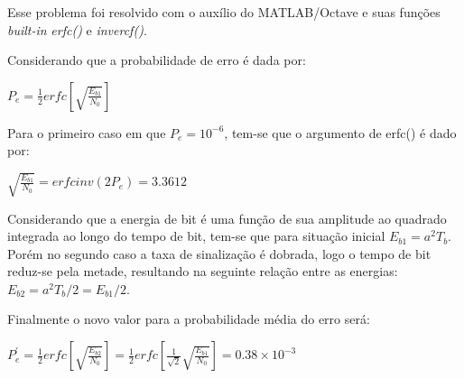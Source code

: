 Esse problema foi resolvido com o auxílio do MATLAB/Octave e suas funções \textit{built-in} \textit{erfc()} e \textit{invercf()}.

Considerando que a probabilidade de erro é dada por:

\begin{center}
    $P_e = \frac{1}{2} erfc \left[\sqrt{\frac{E_{b1}}{N_0}} \right]$
\end{center}

Para o primeiro caso em que $P_e = 10^{-6}$, tem-se que o argumento de erfc() é dado por:

\begin{center}
   $\sqrt{\frac{E_{b1}}{N_0}} = erfcinv(2P_e) = 3.3612$
\end{center}

Considerando que a energia de bit é uma função de sua amplitude ao quadrado integrada ao longo do tempo de bit, tem-se que para situação inicial $E_{b1} = a^2 T_b$. Porém no segundo caso a taxa de sinalização é dobrada, logo o tempo de bit reduz-se pela metade, resultando na seguinte relação entre as energias: $E_{b2} = a^2 T_b/2 = E_{b1}/2$.

Finalmente o novo valor para a probabilidade média do erro será:

\begin{center}
   $P_e^{'}= \frac{1}{2} erfc\left[\sqrt{\frac{E_{b2}}{N_0}} \right] = \frac{1}{2} erfc\left[\frac{1}{\sqrt{2}}\sqrt{\frac{E_{b1}}{N_0}} \right] = 0.38 \times 10^{-3} $
\end{center}

\newpage